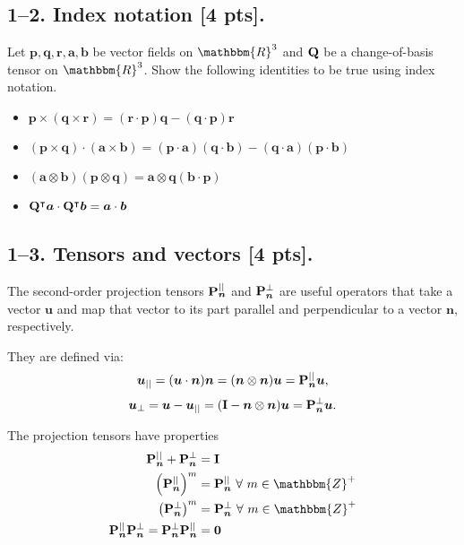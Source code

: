 \bigskip
\subsection*{1--2. \textbf{Index notation} [4 pts].} Let $\bm{p}, \bm{q}, \bm{r}, \bm{a}, \bm{b}$ be vector fields on $\mathbbm{R}^3$ and $\mathbf{Q}$ be a change-of-basis tensor on $\mathbbm{R}^3$. Show the following identities to be true using index notation. 

\begin{itemize}
    \item $\bm{p} \times (\bm{q} \times \bm{r}) = (\bm{r} \cdot \bm{p}) \bm{q} - (\bm{q} \cdot \bm{p}) \bm{r}$
    \item $(\bm{p} \times \bm{q}) \cdot (\bm{a} \times \bm{b}) = (\bm{p} \cdot \bm{a}) (\bm{q} \cdot \bm{b}) - (\bm{q} \cdot \bm{a})(\bm{p} \cdot \bm{b})$
    \item $(\bm{a} \otimes \bm{b})(\bm{p} \otimes \bm{q}) = \bm{a}\otimes\bm{q}(\bm{b} \cdot \bm{p}) $
    \item $\mathbf{Q}^\intercal\bm{a} \cdot \mathbf{Q}^\intercal\bm{b} = \bm{a}\cdot\bm{b} $
\end{itemize}

\subsection*{1--3. \textbf{Tensors and vectors} [4 pts].}
The second-order projection tensors $\mathbf{P}_{\bm{n}}^{||}$ and $\mathbf{P}_{\bm{n}}^{\perp}$ are useful operators that take a vector $\bm{u}$ and map that vector to its part parallel and perpendicular to a vector $\bm{n}$, respectively. 

They are defined via:
\begin{equation*}
    \bm{u}_{||} = (\bm{u} \cdot \bm{n}) \bm{n} = (\bm{n} \otimes \bm{n}) \bm{u} = \mathbf{P}_{\bm{n}}^{||} \bm{u},
\end{equation*}
\begin{equation*}
    \bm{u}_{\perp} = \bm{u} - \bm{u}_{||} = (\mathbf{I} - \bm{n} \otimes \bm{n}) \bm{u} = \mathbf{P}_{\bm{n}}^{\perp} \bm{u}.
\end{equation*}

The projection tensors have properties
\begin{align*}
    \bn{P}_{\bm{n}}^{||} + \bn{P}_{\bm{n}}^{\perp} &= \bn{I} \\
    \left(\bn{P}_{\bm{n}}^{||} \right)^m &= \bn{P}_{\bm{n}}^{||} ~\forall ~m \in \mathbbm{Z}^+\\
    \left(\bn{P}_{\bm{n}}^{\perp} \right)^m &= \bn{P}_{\bm{n}}^{\perp} ~\forall ~m \in \mathbbm{Z}^+\\
    \bn{P}_{\bm{n}}^{||} \bn{P}_{\bm{n}}^{\perp} = \bn{P}_{\bm{n}}^{\perp} \bn{P}_{\bm{n}}^{||}  &= \bn{0}
\end{align*}

